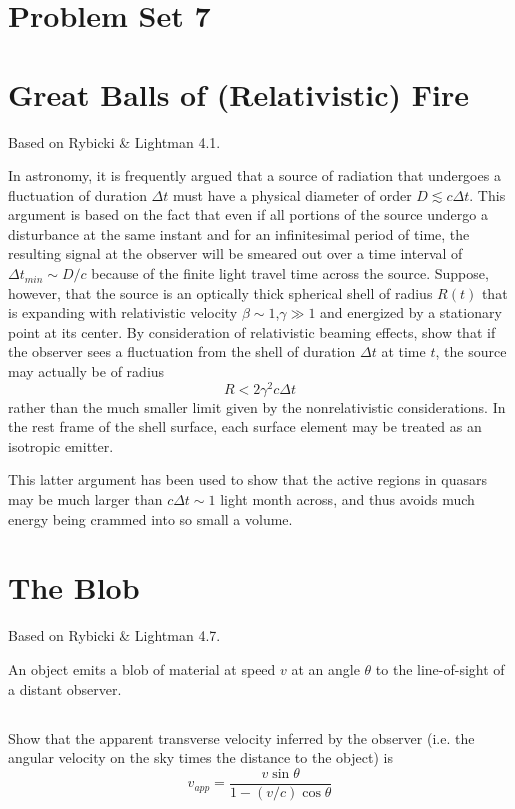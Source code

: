 \documentclass[11pt]{article}
\begin{document}
\pagestyle{empty}

\section*{\centering Problem Set 7}

\section{Great Balls of (Relativistic) Fire}

Based on Rybicki \& Lightman 4.1.

In astronomy, it is frequently argued that a source of radiation that
undergoes a fluctuation of duration $\Delta t$ must have a physical
diameter of order $D\lesssim c\Delta t$.  This argument is based on the 
fact that even if all portions of the source undergo a disturbance at the same instant
and for an infinitesimal period of time, the resulting signal at the
observer will be smeared out over a time interval of $\Delta t_{min}\sim D/c$
because of the finite light travel time across the source.  Suppose, however,
that the source is an optically thick spherical shell of radius $R(t)$ that
is expanding with relativistic velocity $\beta\sim1$,$\gamma\gg1$ and energized
by a stationary point at its center.  
By consideration of relativistic beaming effects,
show that if the observer sees a fluctuation from the shell of duration $\Delta t$
at time $t$, the source may actually be of radius
\begin{equation}
R<2\gamma^2c\Delta t
\end{equation}
rather than the much smaller limit given by the nonrelativistic considerations.
In the rest frame of the shell surface, each surface element may be treated
as an isotropic emitter.

This latter argument has been used to show that the active regions
in quasars may be much larger than $c\Delta t\sim1$ light month across,
and thus avoids much energy being crammed into so small a volume.

\section{The Blob}

Based on Rybicki \& Lightman 4.7.

An object emits a blob of material at speed $v$ at an angle $\theta$ to
the line-of-sight of a distant observer.

\subsection{}
Show that the apparent transverse velocity inferred by the observer
(i.e. the angular velocity on the sky times the distance to the object) is
\begin{equation}
v_{app}=\frac{v\sin\theta}{1-(v/c)\cos\theta}
\end{equation}
\end{document}
